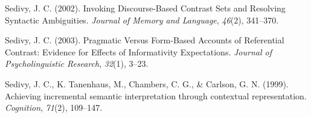 \documentclass[10pt, letterpaper]{article}
\begin{document}
\hypertarget{ref-sedivy_invoking_2002}{}
Sedivy, J. C. (2002). Invoking Discourse-Based Contrast Sets and
Resolving Syntactic Ambiguities. \emph{Journal of Memory and Language},
\emph{46}(2), 341--370.

\hypertarget{ref-sedivy_pragmatic_2003-2}{}
Sedivy, J. C. (2003). Pragmatic Versus Form-Based Accounts of
Referential Contrast: Evidence for Effects of Informativity
Expectations. \emph{Journal of Psycholinguistic Research}, \emph{32}(1),
3--23.

\hypertarget{ref-sedivy_achieving_1999}{}
Sedivy, J. C., K. Tanenhaus, M., Chambers, C. G., \& Carlson, G. N.
(1999). Achieving incremental semantic interpretation through contextual
representation. \emph{Cognition}, \emph{71}(2), 109--147.


\end{document}
